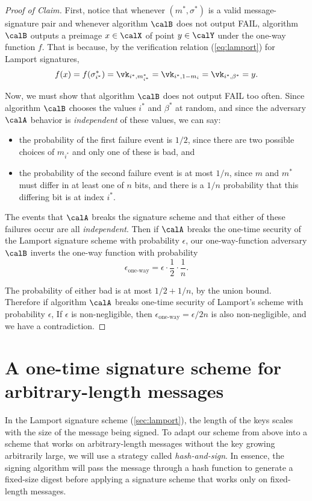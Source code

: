 \begin{proof}[Proof of Claim]
First, notice that whenever $(m^*, \sigma^*)$ is a valid message-signature
pair and whenever algorithm $\calB$ does not output FAIL, algorithm $\calB$
outputs a preimage $x \in \calX$ of point $y \in \calY$ under the one-way function $f$.
That is because, by the verification relation (\ref{eq:lamport}) for Lamport signatures,
\[f(x) = f(\sigma^*_{i^*}) = \vk_{i^*,m^*_{i^*}} = \vk_{i^*, 1 - m_i} = \vk_{i^*, \beta^*} = y.\]

Now, we must show that algorithm $\calB$ does not output FAIL too often.
Since algorithm $\calB$ chooses the values $i^*$ and $\beta^*$ at random,
and since the adversary $\calA$ behavior is \emph{independent} of these values,
we can say:
  \begin{itemize}
    \item the probability of the first failure event is $1/2$,
          since there are two possible choices of $m_{i^*}$ and only 
          one of these is bad, and 
    \item the probability of the second failure event is at most $1/n$,
          since $m$ and $m^*$ must differ in at least one of $n$ bits,
          and there is a $1/n$ probability that this differing bit is
          at index $i^*$.
  \end{itemize}

The events that $\calA$ breaks the signature scheme
and that either of these failures occur are all \emph{independent}.
Then if $\calA$ breaks the one-time security of the Lamport signature scheme with probability $\epsilon$,
our one-way-function adversary $\calB$
inverts the one-way function with probability
\[ \epsilon_\text{one-way} = \epsilon \cdot \frac{1}{2} \cdot \frac{1}{n}.\]

The probability of either bad is at most $1/2 + 1/n$,
by the union bound.
Therefore if algorithm $\calA$ breaks one-time security of Lamport's
scheme with probability $\epsilon$,
If $\epsilon$ is non-negligible, then $\epsilon_\text{one-way} = \epsilon/2n$
is also non-negligible, and we have a contradiction.
\end{proof}


\section{A one-time signature scheme for arbitrary-length messages}
In the Lamport signature scheme (\cref{sec:lamport}), the length of the keys scales with the size of the message being signed.
To adapt our scheme from above into a scheme that works on arbitrary-length messages without the key growing arbitrarily large, we will use a strategy called \emph{hash-and-sign}.
In essence, the signing algorithm will pass the message through a hash function to generate a fixed-size digest before applying a signature
scheme that works only on fixed-length messages.

